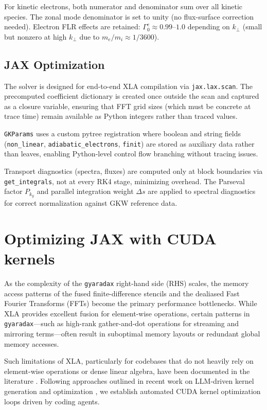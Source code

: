 \documentclass{article}
\theoremstyle{plain}
\theoremstyle{definition}
\theoremstyle{remark}
\begin{document}
For kinetic electrons, both numerator and denominator sum over all kinetic species. The zonal mode denominator is set to unity (no flux-surface correction needed). Electron FLR effects are retained: $\Gamma_0^e \approx 0.99$--$1.0$ depending on $k_\perp$ (small but nonzero at high $k_\perp$ due to $m_e/m_i \approx 1/3600$).

\subsection{JAX Optimization}
The solver is designed for end-to-end XLA compilation via \texttt{jax.lax.scan}. The precomputed coefficient dictionary is created once outside the scan and captured as a closure variable, ensuring that FFT grid sizes (which must be concrete at trace time) remain available as Python integers rather than traced values.

\texttt{GKParams} uses a custom pytree registration where boolean and string fields (\texttt{non\_linear}, \texttt{adiabatic\_electrons}, \texttt{finit}) are stored as auxiliary data rather than leaves, enabling Python-level control flow branching without tracing issues.

Transport diagnostics (spectra, fluxes) are computed only at block boundaries via \texttt{get\_integrals}, not at every RK4 stage, minimizing overhead. The Parseval factor $P_{k_y}$ and parallel integration weight $\Delta s$ are applied to spectral diagnostics for correct normalization against GKW reference data.

\section{Optimizing JAX with CUDA kernels}
\label{app:cuda_kernels}

As the complexity of the \texttt{gyaradax} right-hand side (RHS) scales, the memory access patterns of the fused finite-difference stencils and the dealiased Fast Fourier Transforms (FFTs) become the primary performance bottlenecks. While XLA provides excellent fusion for element-wise operations, certain patterns in \texttt{gyaradax}---such as high-rank gather-and-dot operations for streaming and mirroring terms---often result in suboptimal memory layouts or redundant global memory accesses.

Such limitations of XLA, particularly for codebases that do not heavily rely on element-wise operations or dense linear algebra, have been documented in the literature \cite{jakob2022dr}. Following approaches outlined in recent work on LLM-driven kernel generation and optimization \cite{ouyang2025kernelbench, zhu2026qimeng, wei2025astra}, we establish automated CUDA kernel optimization loops driven by coding agents.
\end{document}
